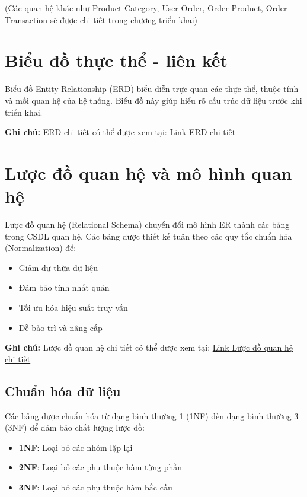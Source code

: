 (Các quan hệ khác như Product-Category, User-Order, Order-Product, Order-Transaction sẽ được chi tiết trong chương triển khai)

\section{Biểu đồ thực thể - liên kết}

Biểu đồ Entity-Relationship (ERD) biểu diễn trực quan các thực thể, thuộc tính và mối quan hệ của hệ thống. Biểu đồ này giúp hiểu rõ cấu trúc dữ liệu trước khi triển khai.


\noindent\textbf{Ghi chú:} ERD chi tiết có thể được xem tại: \href{https://app.diagrams.net/#G1g_RqoPLPuSLjwRFIDlHRrrfHX-V_i_gY#%7B%22pageId%22%3A%22vO9RbflX9j12d0YCGTg0%22%7D}{Link ERD chi tiết}
\section{Lược đồ quan hệ và mô hình quan hệ}

Lược đồ quan hệ (Relational Schema) chuyển đổi mô hình ER thành các bảng trong CSDL quan hệ. Các bảng được thiết kế tuân theo các quy tắc chuẩn hóa (Normalization) để:

\begin{itemize}
    \item Giảm dư thừa dữ liệu
    \item Đảm bảo tính nhất quán
    \item Tối ưu hóa hiệu suất truy vấn
    \item Dễ bảo trì và nâng cấp
\end{itemize}

\noindent\textbf{Ghi chú:} Lược đồ quan hệ chi tiết có thể được xem tại: \href{https://app.diagrams.net/#G1rsS-G0XpKDhbjLzF8yBIAsfZig9Ut-Ro#%7B%22pageId%22%3A%22gE6GouQA1yZOGQsXPoV9%22%7D}{Link Lược đồ quan hệ chi tiết}

\subsection{Chuẩn hóa dữ liệu}

Các bảng được chuẩn hóa từ dạng bình thường 1 (1NF) đến dạng bình thường 3 (3NF) để đảm bảo chất lượng lược đồ:

\begin{itemize}
    \item \textbf{1NF}: Loại bỏ các nhóm lặp lại
    \item \textbf{2NF}: Loại bỏ các phụ thuộc hàm từng phần
    \item \textbf{3NF}: Loại bỏ các phụ thuộc hàm bắc cầu
\end{itemize}

